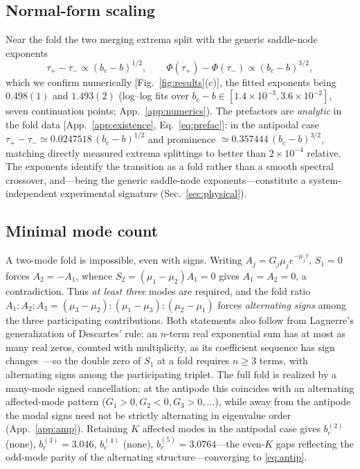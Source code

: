 \documentclass[reprint,amsmath,amssymb,aps,prresearch,longbibliography]{revtex4-2}
\begin{document}
\subsection{Normal-form scaling}\label{sec:existC}
Near the fold the two merging extrema split with the generic saddle-node exponents
\begin{equation}
\tau_+-\tau_-\propto(b_c-b)^{1/2},\qquad
\Phi(\tau_+)-\Phi(\tau_-)\propto(b_c-b)^{3/2},
\label{eq:scaling}
\end{equation}
which we confirm numerically [Fig.~\ref{fig:results}(c)], the fitted exponents being $0.498(1)$ and
$1.493(2)$ (log--log fits over $b_c-b\in[1.4\times10^{-3},3.6\times10^{-2}]$, seven continuation
points; App.~\ref{app:numerics}). The prefactors are \emph{analytic} in the fold data [App.~\ref{app:existence},
Eq.~\eqref{eq:prefac}]: in the antipodal case $\tau_+-\tau_-\simeq0.0247518\,(b_c-b)^{1/2}$ and
prominence $\simeq0.357444\,(b_c-b)^{3/2}$, matching directly measured extrema splittings to better
than $2\times10^{-4}$ relative. The exponents identify the transition as a fold rather than a smooth
spectral crossover, and---being the generic saddle-node exponents---constitute a system-independent
experimental signature (Sec.~\ref{sec:physical}).

\subsection{Minimal mode count}\label{sec:existD}
A two-mode fold is impossible, even with signs. Writing $A_j=G_j\mu_j e^{-\mu_j\tau}$, $S_1=0$ forces
$A_2=-A_1$, whence $S_2=(\mu_1-\mu_2)A_1=0$ gives $A_1=A_2=0$, a contradiction. Thus \emph{at least
three} modes are required, and the fold ratio $A_1:A_2:A_3=(\mu_3-\mu_2):(\mu_1-\mu_3):(\mu_2-\mu_1)$
forces \emph{alternating signs} among the three participating contributions. Both statements also
follow from Laguerre's generalization of Descartes' rule: an $n$-term real exponential sum has at
most as many real zeros, counted with multiplicity, as its coefficient sequence has sign
changes~\cite{PolyaSzego1976}---so the double zero of $S_1$ at a fold requires $n\ge3$ terms, with
alternating signs among the participating triplet. The full fold is realized
by a many-mode signed cancellation; at the antipode this coincides with an alternating affected-mode
pattern ($G_1>0,G_2<0,G_3>0,\dots$), while away from the antipode the modal signs need not be strictly
alternating in eigenvalue order (App.~\ref{app:amp}). Retaining $K$ affected modes in the antipodal
case gives $b_c^{(2)}$ (none), $b_c^{(3)}=3.046$, $b_c^{(4)}$ (none), $b_c^{(5)}=3.0764$---the even-$K$
gaps reflecting the odd-mode parity of the alternating structure---converging to \eqref{eq:antip}.
\end{document}
